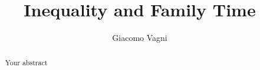 \documentclass[12pt]{article}
\title{Inequality and Family Time}
\author[]{Giacomo Vagni}
\affil[]{Centre for Time Use Research, \\ University of Oxford}
\date{}
\begin{document}
\maketitle

\begin{abstract}
  Your abstract
\end{abstract}
\end{document}
